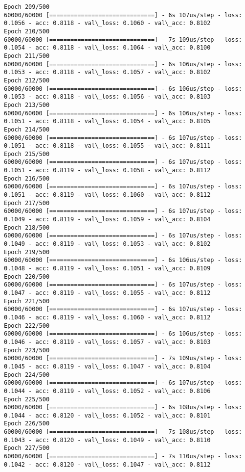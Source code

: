 \documentclass[11pt]{article}
\begin{document}
\begin{Verbatim}[commandchars=\\\{\}]
Epoch 209/500
60000/60000 [==============================] - 6s 107us/step - loss: 0.1056 - acc: 0.8118 - val\_loss: 0.1060 - val\_acc: 0.8102
Epoch 210/500
60000/60000 [==============================] - 7s 109us/step - loss: 0.1054 - acc: 0.8118 - val\_loss: 0.1064 - val\_acc: 0.8100
Epoch 211/500
60000/60000 [==============================] - 6s 106us/step - loss: 0.1053 - acc: 0.8118 - val\_loss: 0.1057 - val\_acc: 0.8102
Epoch 212/500
60000/60000 [==============================] - 6s 106us/step - loss: 0.1053 - acc: 0.8118 - val\_loss: 0.1056 - val\_acc: 0.8103
Epoch 213/500
60000/60000 [==============================] - 6s 106us/step - loss: 0.1051 - acc: 0.8118 - val\_loss: 0.1054 - val\_acc: 0.8105
Epoch 214/500
60000/60000 [==============================] - 6s 107us/step - loss: 0.1051 - acc: 0.8118 - val\_loss: 0.1055 - val\_acc: 0.8111
Epoch 215/500
60000/60000 [==============================] - 6s 107us/step - loss: 0.1051 - acc: 0.8119 - val\_loss: 0.1058 - val\_acc: 0.8112
Epoch 216/500
60000/60000 [==============================] - 6s 107us/step - loss: 0.1051 - acc: 0.8119 - val\_loss: 0.1060 - val\_acc: 0.8112
Epoch 217/500
60000/60000 [==============================] - 6s 107us/step - loss: 0.1049 - acc: 0.8119 - val\_loss: 0.1059 - val\_acc: 0.8104
Epoch 218/500
60000/60000 [==============================] - 6s 107us/step - loss: 0.1049 - acc: 0.8119 - val\_loss: 0.1053 - val\_acc: 0.8102
Epoch 219/500
60000/60000 [==============================] - 6s 106us/step - loss: 0.1048 - acc: 0.8119 - val\_loss: 0.1051 - val\_acc: 0.8109
Epoch 220/500
60000/60000 [==============================] - 6s 107us/step - loss: 0.1047 - acc: 0.8119 - val\_loss: 0.1055 - val\_acc: 0.8112
Epoch 221/500
60000/60000 [==============================] - 6s 107us/step - loss: 0.1046 - acc: 0.8119 - val\_loss: 0.1060 - val\_acc: 0.8112
Epoch 222/500
60000/60000 [==============================] - 6s 106us/step - loss: 0.1046 - acc: 0.8119 - val\_loss: 0.1057 - val\_acc: 0.8103
Epoch 223/500
60000/60000 [==============================] - 7s 109us/step - loss: 0.1045 - acc: 0.8119 - val\_loss: 0.1047 - val\_acc: 0.8104
Epoch 224/500
60000/60000 [==============================] - 6s 107us/step - loss: 0.1044 - acc: 0.8119 - val\_loss: 0.1052 - val\_acc: 0.8106
Epoch 225/500
60000/60000 [==============================] - 6s 108us/step - loss: 0.1044 - acc: 0.8120 - val\_loss: 0.1052 - val\_acc: 0.8101
Epoch 226/500
60000/60000 [==============================] - 7s 108us/step - loss: 0.1043 - acc: 0.8120 - val\_loss: 0.1049 - val\_acc: 0.8110
Epoch 227/500
60000/60000 [==============================] - 7s 110us/step - loss: 0.1042 - acc: 0.8120 - val\_loss: 0.1047 - val\_acc: 0.8112

\end{Verbatim}
\end{document}

